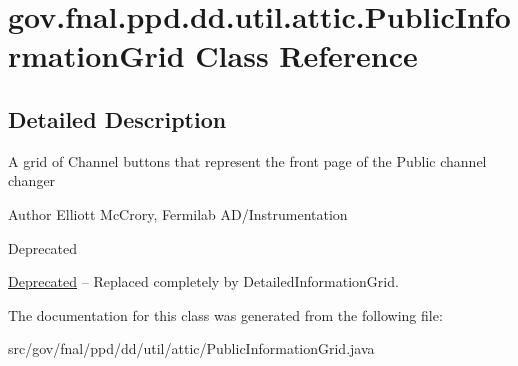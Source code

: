 \hypertarget{classgov_1_1fnal_1_1ppd_1_1dd_1_1util_1_1attic_1_1PublicInformationGrid}{\section{gov.\-fnal.\-ppd.\-dd.\-util.\-attic.\-Public\-Information\-Grid Class Reference}
\label{classgov_1_1fnal_1_1ppd_1_1dd_1_1util_1_1attic_1_1PublicInformationGrid}
}


\subsection{Detailed Description}
A grid of Channel buttons that represent the front page of the Public channel changer

\begin{DoxyAuthor}{Author}
Elliott Mc\-Crory, Fermilab A\-D/\-Instrumentation
\end{DoxyAuthor}
\begin{DoxyRefDesc}{Deprecated}
\item[\hyperlink{deprecated__deprecated000017}{Deprecated}]-- Replaced completely by Detailed\-Information\-Grid. \end{DoxyRefDesc}


The documentation for this class was generated from the following file\-:\begin{DoxyCompactItemize}
\item 
src/gov/fnal/ppd/dd/util/attic/Public\-Information\-Grid.\-java\end{DoxyCompactItemize}
